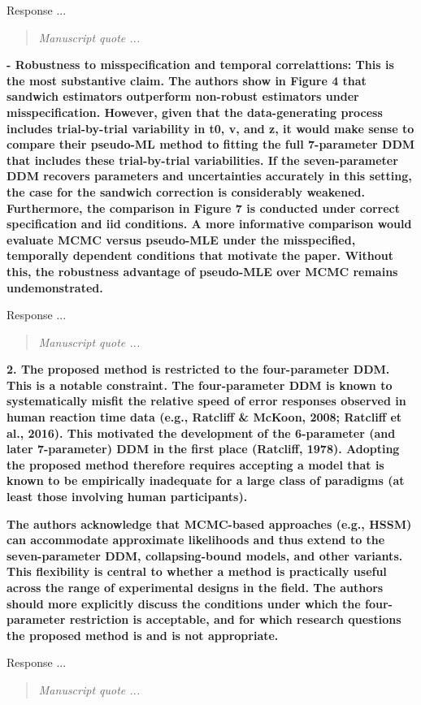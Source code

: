 \documentclass[00-main.tex]{subfiles}
\newcommand{\reviewercomment}[1]{\vspace{0.3cm}\noindent\textbf{#1}\vspace{0.15cm}}
\newcommand{\manuscriptquote}[1]{\begin{quote}\textit{#1}\end{quote}}
\begin{document}
Response ...

\manuscriptquote{Manuscript quote ...}


\reviewercomment{- Robustness to misspecification and temporal correlattions: This is the most substantive claim. The authors show in Figure 4 that sandwich estimators outperform non-robust estimators under misspecification. However, given that the data-generating process includes trial-by-trial variability in t0, v, and z, it would make sense to compare their pseudo-ML method to fitting the full 7-parameter DDM that includes these trial-by-trial variabilities. If the seven-parameter DDM recovers parameters and uncertainties accurately in this setting, the case for the sandwich correction is considerably weakened. Furthermore, the comparison in Figure 7 is conducted under correct specification and iid conditions. A more informative comparison would evaluate MCMC versus pseudo-MLE under the misspecified, temporally dependent conditions that motivate the paper. Without this, the robustness advantage of pseudo-MLE over MCMC remains undemonstrated.}

Response ...

\manuscriptquote{Manuscript quote ...}

\reviewercomment{2. The proposed method is restricted to the four-parameter DDM. This is a notable constraint. The four-parameter DDM is known to systematically misfit the relative speed of error responses observed in human reaction time data (e.g., Ratcliff \& McKoon, 2008; Ratcliff et al., 2016). This motivated the development of the 6-parameter (and later 7-parameter) DDM in the first place (Ratcliff, 1978). Adopting the proposed method therefore requires accepting a model that is known to be empirically inadequate for a large class of paradigms (at least those involving human participants).}

\reviewercomment{The authors acknowledge that MCMC-based approaches (e.g., HSSM) can accommodate approximate likelihoods and thus extend to the seven-parameter DDM, collapsing-bound models, and other variants. This flexibility is central to whether a method is practically useful across the range of experimental designs in the field. The authors should more explicitly discuss the conditions under which the four-parameter restriction is acceptable, and for which research questions the proposed method is and is not appropriate.}

Response ...

\manuscriptquote{Manuscript quote ...}
\end{document}
